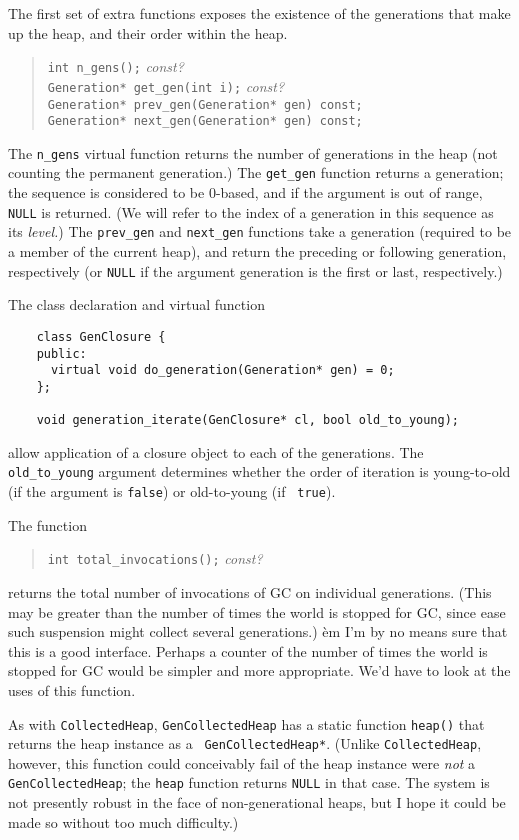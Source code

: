 \documentclass{article}
\begin{document}
The first set of extra functions exposes the existence of the
generations that make up the heap, and their order within the heap.
\begin{quote}
    {\tt int n\_gens();}  {\em const?} \\
    {\tt Generation* get\_gen(int i);}  {\em const?} \\
    {\tt Generation* prev\_gen(Generation* gen) const;} \\
    {\tt Generation* next\_gen(Generation* gen) const;}
\end{quote}
The {\tt n\_gens} virtual function returns the number of generations in
the heap (not counting the permanent generation.)  The {\tt get\_gen}
function returns a generation; the sequence is considered to be
0-based, and if the argument is out of range, {\tt NULL} is returned.
(We will refer to the index of a generation in this sequence as its
{\em level.})
The {\tt prev\_gen} and {\tt next\_gen} functions take a generation
(required to be a member of the current heap), and return the
preceding or following generation, respectively (or {\tt NULL} if
the argument generation is the first or last, respectively.)

The class declaration and virtual function
\begin{verbatim}
    class GenClosure {
    public:
      virtual void do_generation(Generation* gen) = 0;
    };

    void generation_iterate(GenClosure* cl, bool old_to_young);
\end{verbatim}
allow application of a closure object to each of the generations.  The
{\tt old\_to\_young} argument determines whether the order of iteration is
young-to-old (if the argument is {\tt false}) or old-to-young (if {\tt
true}).

The function
\begin{quote}
    {\tt int total\_invocations();} {\em const?}
\end{quote}
returns the total number of invocations of GC on individual
generations.  (This may be greater than the number of times the world
is stopped for GC, since ease such suspension might collect several
generations.)  {\`em I'm by no means sure that this is a good
interface.  Perhaps a counter of the number of times the world is
stopped for GC would be simpler and more appropriate.  We'd have to
look at the uses of this function.}

As with {\tt CollectedHeap}, {\tt GenCollectedHeap} has a static
function {\tt heap()} that returns the heap instance as a {\tt
GenCollectedHeap*}.  (Unlike {\tt CollectedHeap}, however, this
function could conceivably fail of the heap instance were {\em not} a
{\tt GenCollectedHeap}; the {\tt heap} function returns {\tt NULL} in
that case.  The system is not presently robust in the face of
non-generational heaps, but I hope it could be made so without too
much difficulty.)
\end{document}
